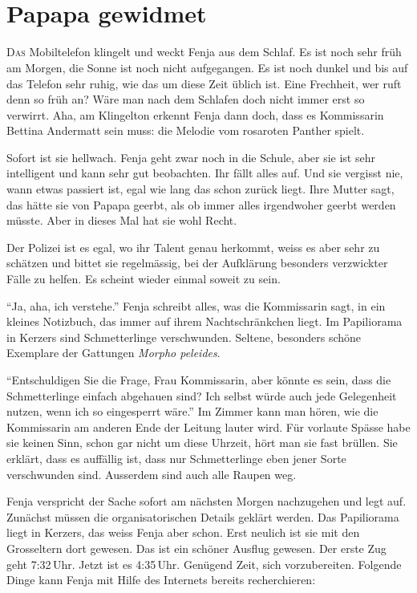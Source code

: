 \chapter*{{}\\\small \color{red} Papapa gewidmet}



\lettrine[lines=3]{\color{red}D}{as} Mobiltelefon klingelt und weckt Fenja aus dem Schlaf. Es ist noch sehr früh am Morgen, die Sonne ist noch nicht aufgegangen. Es ist noch dunkel und bis auf das Telefon sehr ruhig, wie das um diese Zeit üblich ist. Eine Frechheit, wer ruft denn so früh an? Wäre man nach dem Schlafen doch nicht immer erst so verwirrt. Aha, am Klingelton erkennt Fenja dann doch, dass es Kommissarin Bettina Andermatt sein muss: die Melodie vom rosaroten Panther spielt.

Sofort ist sie hellwach. Fenja geht zwar noch in die Schule, aber sie ist sehr intelligent und kann sehr gut beobachten. Ihr fällt alles auf. Und sie vergisst nie, wann etwas passiert ist, egal wie lang das schon zurück liegt. Ihre Mutter sagt, das hätte sie von Papapa geerbt, als ob immer alles irgendwoher geerbt werden müsste. Aber in dieses Mal hat sie wohl Recht. 

Der Polizei ist es egal, wo ihr Talent genau herkommt, weiss es aber sehr zu schätzen und bittet sie regelmässig, bei der Aufklärung besonders verzwickter Fälle zu helfen. Es scheint wieder einmal soweit zu sein.

\enquote{Ja, aha, ich verstehe.} Fenja schreibt alles, was die Kommissarin sagt, in ein kleines Notizbuch, das immer auf ihrem Nachtschränkchen liegt. Im Papiliorama in Kerzers sind Schmetterlinge verschwunden. Seltene, besonders schöne Exemplare der Gattungen \emph{Morpho peleides}.

\enquote{Entschuldigen Sie die Frage, Frau Kommissarin, aber könnte es sein, dass die Schmetterlinge einfach abgehauen sind? Ich selbst würde auch jede Gelegenheit nutzen, wenn ich so eingesperrt wäre.} Im Zimmer kann man hören, wie die Kommissarin am anderen Ende der Leitung lauter wird. Für vorlaute Spässe habe sie keinen Sinn, schon gar nicht um diese Uhrzeit, hört man sie fast brüllen. Sie erklärt, dass es auffällig ist, dass nur Schmetterlinge eben jener Sorte verschwunden sind. Ausserdem sind auch alle Raupen weg.

Fenja verspricht der Sache sofort am nächsten Morgen nachzugehen und legt auf. Zunächst müssen die organisatorischen Details geklärt werden. Das Papiliorama liegt in Kerzers, das weiss Fenja aber schon. Erst neulich ist sie mit den Grosseltern dort gewesen. Das ist ein schöner Ausflug gewesen. Der erste Zug geht 7:32\,Uhr. Jetzt ist es 4:35\,Uhr. Genügend Zeit, sich vorzubereiten. Folgende Dinge kann Fenja mit Hilfe des Internets bereits recherchieren:

